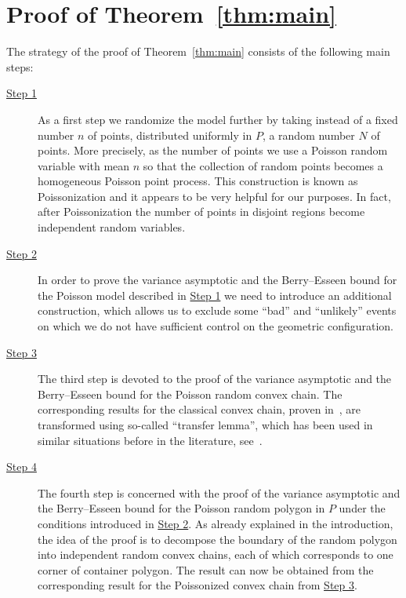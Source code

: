 \documentclass[10pt]{amsart}
\theoremstyle{definition}\newtheorem{defi}[theo]{Definition}\newtheorem{rema}[theo]{Remark}\newtheorem{exam}[theo]{Example}\newtheorem{exem}[theo]{Example}\newtheorem{nota}[theo]{Notation}
\begin{document}
\section{Proof of Theorem~\ref{thm:main}}\label{sec:ProofSquare}

The strategy of the proof of Theorem~\ref{thm:main} consists of the following main steps:
\begin{description}
\item[{\hyperref[subsec1]{Step 1}}] As a first step we randomize the model further by taking instead of a fixed number $n$ of points, distributed uniformly in $P$, a random number $N$ of points. More precisely, as the number of points we use a Poisson random variable with mean $n$ so that the collection of random points becomes a homogeneous Poisson point process. This construction is known as Poissonization and it appears to be very helpful for our purposes. In fact, after Poissonization the number of points in disjoint regions become independent random variables.

\item[{\hyperref[step2]{Step 2}}] In order to prove the variance asymptotic and the Berry--Esseen bound for the Poisson model described in \hyperref[subsec1]{Step 1} we need to introduce an additional construction, which allows us to exclude some ``bad'' and ``unlikely'' events on which we do not have sufficient control on the geometric configuration.

\item[{\hyperref[step3]{Step 3}}] The third step is devoted to the proof of the variance asymptotic and the Berry--Esseen bound for the Poisson random convex chain. The corresponding results for the classical convex chain, proven in~\cite{GT21}, are transformed using so-called ``transfer lemma'', which has been used in similar situations before in the literature, see~\cite{BR06,BR10, BV06,Reitz05,Vu06}.

\item[{\hyperref[step4]{Step 4}}] The fourth step is concerned with the proof of the variance asymptotic and the Berry--Esseen bound for the Poisson random polygon in $P$ under the conditions introduced in \hyperref[step2]{Step 2}. As already explained in the introduction, the idea of the proof is to decompose the boundary of the random polygon into independent random convex chains, each of which corresponds to one corner of container polygon. The result can now be obtained from the corresponding result for the Poissonized convex chain from \hyperref[step3]{Step 3}.


\end{description}
\end{document}
